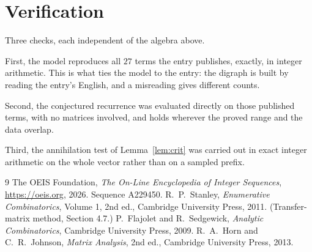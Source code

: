 \documentclass[11pt,a4paper]{article}
\theoremstyle{plain}
\theoremstyle{definition}
\begin{document}
\section{Verification}

Three checks, each independent of the algebra above.

First, the model reproduces all $27$ terms the entry publishes, exactly, in integer
arithmetic. This is what ties the model to the entry: the digraph is built by reading the
entry's English, and a misreading gives different counts.

Second, the conjectured recurrence was evaluated directly on those published terms, with no
matrices involved, and holds wherever the proved range and the data overlap.

Third, the annihilation test of Lemma~\ref{lem:crit} was carried out in exact integer
arithmetic on the whole vector rather than on a sampled prefix.

\begin{thebibliography}{9}
 The OEIS Foundation, \emph{The On-Line Encyclopedia of Integer
Sequences}, \url{https://oeis.org}, 2026. Sequence A229450.
 R.~P.~Stanley, \emph{Enumerative Combinatorics}, Volume 1, 2nd ed.,
Cambridge University Press, 2011. (Transfer-matrix method, Section 4.7.)
 P.~Flajolet and R.~Sedgewick, \emph{Analytic Combinatorics}, Cambridge
University Press, 2009.
 R.~A.~Horn and C.~R.~Johnson, \emph{Matrix Analysis}, 2nd ed., Cambridge
University Press, 2013.
\end{thebibliography}
\end{document}
